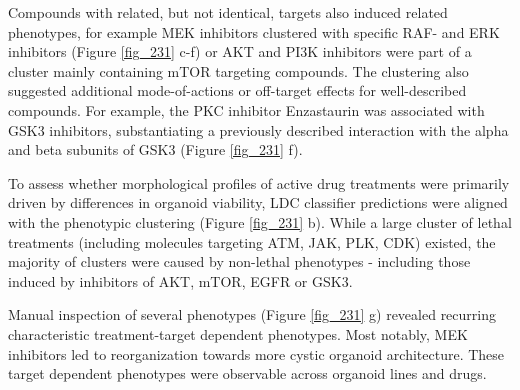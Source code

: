 \begin{flushleft}
Compounds with related, but not identical, targets also induced related phenotypes, for example MEK inhibitors clustered with specific RAF- and ERK inhibitors (Figure \ref{fig_231} c-f) or AKT and PI3K inhibitors were part of a cluster mainly containing mTOR targeting compounds. The clustering also suggested additional mode-of-actions or off-target effects for well-described compounds. For example, the PKC inhibitor Enzastaurin was associated with GSK3 inhibitors, substantiating a previously described interaction with the alpha and beta subunits of GSK3 \cite{Kotliarova2008-tz, Klaeger2017-vu} (Figure \ref{fig_231} f). 

\bigbreak
To assess whether morphological profiles of active drug treatments were primarily driven by differences in organoid viability, LDC classifier predictions were aligned with the phenotypic clustering (Figure \ref{fig_231} b). While a large cluster of lethal treatments (including molecules targeting ATM, JAK, PLK, CDK) existed, the majority of clusters were caused by non-lethal phenotypes - including those induced by inhibitors of AKT, mTOR, EGFR or GSK3.

\bigbreak

Manual inspection of several phenotypes (Figure \ref{fig_231} g) revealed recurring characteristic treatment-target dependent phenotypes. Most notably, MEK inhibitors led to reorganization towards more cystic organoid architecture. These target dependent phenotypes were observable across organoid lines and drugs.



\end{flushleft}
